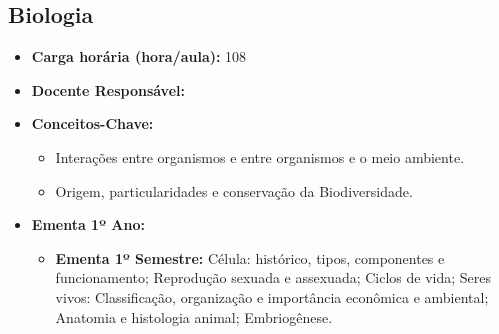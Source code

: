 \documentclass[11pt,fleqn]{book} %
\begin{document}
\subsection{Biologia}\label{disc:biologia}
\begin{itemize}
	\item \textbf{Carga horária (hora/aula):} 108
	\item \textbf{Docente Responsável:}
	\item \textbf{Conceitos-Chave:}
	\begin{itemize}
		\item Interações entre organismos e entre organismos e o meio ambiente.
		\item Origem, particularidades e conservação da Biodiversidade.
	\end{itemize}
	\item \textbf{Ementa 1º Ano:}
	\begin{itemize}
		\item \textbf{Ementa 1º Semestre:} 
		Célula: histórico, tipos, componentes e funcionamento; 
		Reprodução sexuada e assexuada; 
		Ciclos de vida; Seres vivos: Classiﬁcação, organização e importância econômica e ambiental; 
		Anatomia e histologia animal;
		Embriogênese.
		

\end{itemize}
\end{itemize}
\end{document}
